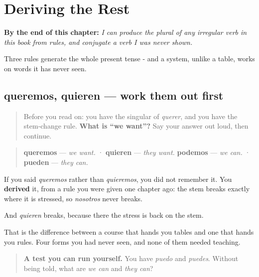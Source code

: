 
\chapter{Deriving the Rest}
\label{ch:spanish-derive-plurals}

\begin{chapteropening}
\textbf{By the end of this chapter:} \emph{I can produce the plural of any irregular verb in this book from rules, and conjugate a verb I was never shown.}

Three rules generate the whole present tense - and a system, unlike a table, works on words it has never seen.
\end{chapteropening}

\section[queremos · quieren]{queremos, quieren — work them out first}

\label{lesson:ES-C13-plurales-cambio}



\begin{quote}
Before you read on: you have the singular of \emph{querer}, and you have the stem-change rule. \textbf{What is \textquotedblleft{}we want\textquotedblright{}?} Say your answer out loud, then continue.
\end{quote}

\begin{grammarlens}[title={Grammar Lens: you were right}]
\begin{quote}
\textbf{queremos} — \emph{we want.}  ·  \textbf{quieren} — \emph{they want.} \textbf{podemos} — \emph{we can.}  ·  \textbf{pueden} — \emph{they can.}
\end{quote}

If you said \emph{queremos} rather than \emph{quieremos}, you did not remember it. You \textbf{derived} it, from a rule you were given one chapter ago: the stem breaks exactly where it is stressed, so \emph{nosotros} never breaks.

And \emph{quieren} breaks, because there the stress is back on the stem.

That is the difference between a course that hands you tables and one that hands you rules. Four forms you had never seen, and none of them needed teaching.

\begin{quote}
\textbf{A test you can run yourself.} You have \emph{puedo} and \emph{puedes}. Without being told, what are \emph{we can} and \emph{they can}?
\end{quote}
\end{grammarlens}

